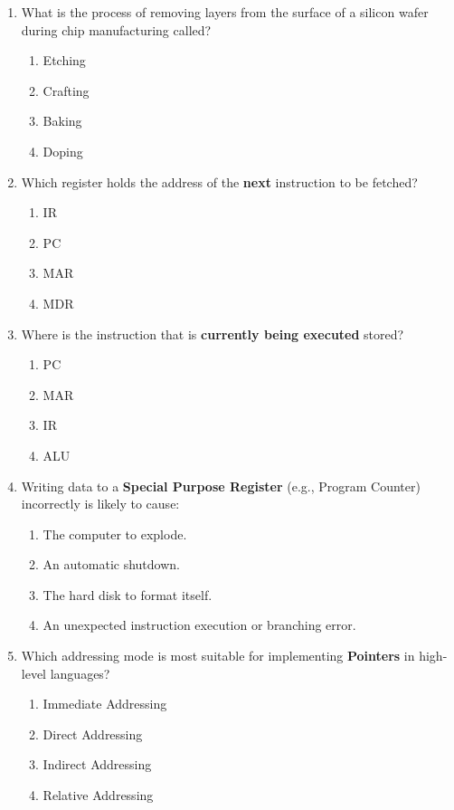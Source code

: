 \documentclass[a4paper,12pt]{article}
\begin{document}
\begin{enumerate}[label=\textbf{\arabic*.}]
    \item What is the process of removing layers from the surface of a silicon wafer during chip manufacturing called?
    \begin{enumerate}[label=\alph*)]
        \item Etching
        \item Crafting
        \item Baking
        \item Doping
    \end{enumerate}

    \item Which register holds the address of the \textbf{next} instruction to be fetched?
    \begin{enumerate}[label=\alph*)]
        \item IR
        \item PC
        \item MAR
        \item MDR
    \end{enumerate}

    \item Where is the instruction that is \textbf{currently being executed} stored?
    \begin{enumerate}[label=\alph*)]
        \item PC
        \item MAR
        \item IR
        \item ALU
    \end{enumerate}
    
    \item Writing data to a \textbf{Special Purpose Register} (e.g., Program Counter) incorrectly is likely to cause:
    \begin{enumerate}[label=\alph*)]
        \item The computer to explode.
        \item An automatic shutdown.
        \item The hard disk to format itself.
        \item An unexpected instruction execution or branching error.
    \end{enumerate}

    \item Which addressing mode is most suitable for implementing \textbf{Pointers} in high-level languages?
    \begin{enumerate}[label=\alph*)]
        \item Immediate Addressing
        \item Direct Addressing
        \item Indirect Addressing
        \item Relative Addressing
    \end{enumerate}


\end{enumerate}
\end{document}
